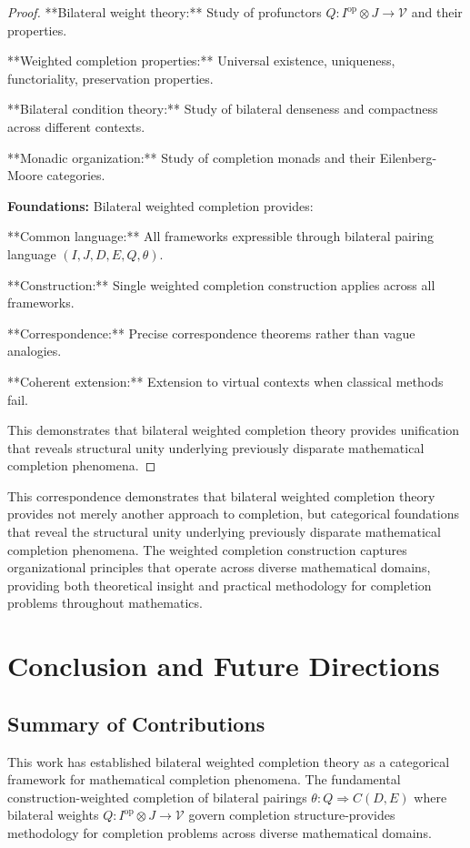 \documentclass[11pt]{article}
\theoremstyle{plain}
\theoremstyle{definition}
\theoremstyle{remark}
\newcommand{\V}{\mathcal{V}}
\newcommand{\op}{\mathrm{op}}
\begin{document}
\begin{proof}
**Bilateral weight theory:** Study of profunctors $Q : I^{\op} \otimes J \to \V$ and their properties.

**Weighted completion properties:** Universal existence, uniqueness, functoriality, preservation properties.

**Bilateral condition theory:** Study of bilateral denseness and compactness across different contexts.

**Monadic organization:** Study of completion monads and their Eilenberg-Moore categories.

\textbf{Foundations:} Bilateral weighted completion provides:

**Common language:** All frameworks expressible through bilateral pairing language $(I, J, D, E, Q, \theta)$.

**Construction:** Single weighted completion construction applies across all frameworks.

**Correspondence:** Precise correspondence theorems rather than vague analogies.

**Coherent extension:** Extension to virtual contexts when classical methods fail.

This demonstrates that bilateral weighted completion theory provides unification that reveals structural unity underlying previously disparate mathematical completion phenomena.
\end{proof}

This correspondence demonstrates that bilateral weighted completion theory provides not merely another approach to completion, but categorical foundations that reveal the structural unity underlying previously disparate mathematical completion phenomena. The weighted completion construction captures organizational principles that operate across diverse mathematical domains, providing both theoretical insight and practical methodology for completion problems throughout mathematics.

\section{Conclusion and Future Directions}

\subsection{Summary of Contributions}

This work has established bilateral weighted completion theory as a categorical framework for mathematical completion phenomena. The fundamental construction-weighted completion of bilateral pairings $\theta : Q \Rightarrow C(D,E)$ where bilateral weights $Q : I^{\op} \otimes J \to \V$ govern completion structure-provides methodology for completion problems across diverse mathematical domains.
\end{document}
